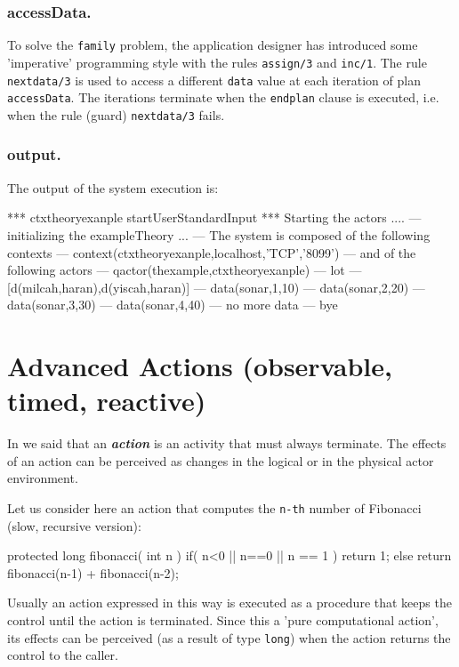 \subsubsection{accessData.}
To solve the \texttt{family} problem, the application designer has introduced some 'imperative' programming style with the rules \texttt{assign/3} and \texttt{inc/1}. The rule \texttt{nextdata/3} is used to access a different \texttt{data} value at each iteration of plan \texttt{accessData}. The iterations terminate when the \texttt{endplan} clause is executed, i.e. when the rule (guard) \texttt{nextdata/3} fails.


\subsubsection{output.}
The output of the system execution is:
\begin{javacode}
*** ctxtheoryexanple startUserStandardInput ***
Starting the actors .... 
--- initializing the exampleTheory ...
--- 	The system is composed of the following contexts
--- context(ctxtheoryexanple,localhost,'TCP','8099')
--- 	 and  of the following actors
--- qactor(thexample,ctxtheoryexanple)
--- lot
--- [d(milcah,haran),d(yiscah,haran)]
--- data(sonar,1,10)
--- data(sonar,2,20)
--- data(sonar,3,30)
--- data(sonar,4,40)
--- no more data
--- bye
\end{javacode}

\newpage 
\section{Advanced Actions (observable, timed, reactive)}

In  we said that an \textit{\textbf{action}} is an activity that must always terminate. The effects of an action can be perceived as changes in the logical or in the physical actor environment.

Let us consider here an action that computes the \texttt{n-th} number of Fibonacci (slow, recursive version):

\begin{javacode}
	protected long fibonacci( int n ){
		if( n<0 || n==0 || n == 1 ) return 1;
		else return fibonacci(n-1) + fibonacci(n-2);
	}
\end{javacode}

Usually an action expressed in this way is executed as a procedure that keeps the control until the action is terminated. Since this a 'pure computational action', its effects can be perceived (as a result of type \texttt{long}) when the action returns the control to the caller.


